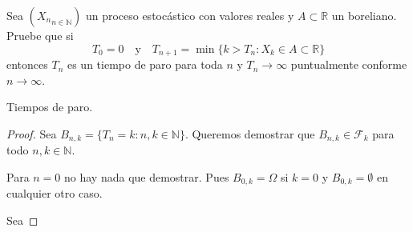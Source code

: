 \begin{problema}
	Sea $\left({X_n}_{n\in\mathbb{N}}\right)$ un proceso estocástico con valores reales y $A\subset \mathbb{R}$ un boreliano. 
	Pruebe que si
	$$T_0=0\quad\text{y}\quad T_{n+1}=\min\{k>T_n: X_k\in A \subset \mathbb{R}\}$$
	entonces $T_n$ es un tiempo de paro para toda $n$ y $T_n\to \infty$ puntualmente conforme $n\to\infty$. 

	\begin{categoria} 
		Tiempos de paro.
	\end{categoria}
\end{problema}
		
\begin{proof}
 Sea $B_{n,k} = \{ T_n = k : n,k \in \mathbb{N}\}$. Queremos demostrar que $B_{n,k} \in \mathscr{F}_k$ para todo $n,k \in \mathbb{N}$.

 Para $n=0$ no hay nada que demostrar. Pues $B_{0,k} = \Omega$ si $k=0$ y $B_{0,k} = \emptyset$ en cualquier otro caso. 

 Sea 
\end{proof}